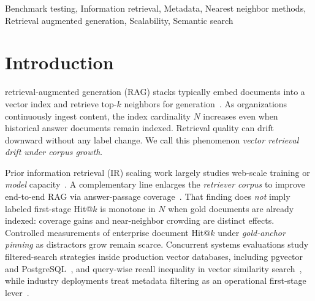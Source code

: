 \documentclass{ieeeaccess}
\makeatletter
\DeclareRobustCommand{\_}{\ifmmode\nfss@text{\textunderscore}\else\textunderscore\allowbreak\fi}
\makeatother
\begin{document}
\begin{keywords}
Benchmark testing, Information retrieval, Metadata, Nearest neighbor methods, Retrieval augmented generation, Scalability, Semantic search
\end{keywords}

\titlepgskip=-15pt
\maketitle

\section{Introduction}
\label{sec:introduction}
 retrieval-augmented generation (RAG) stacks typically embed documents into a vector index and retrieve top-$k$ neighbors for generation~\cite{lewis2020rag,karpukhin2020dpr}. As organizations continuously ingest content, the index cardinality $N$ increases even when historical answer documents remain indexed. Retrieval quality can drift downward without any label change. We call this phenomenon \emph{vector retrieval drift under corpus growth}.

Prior information retrieval (IR) scaling work largely studies web-scale training or \emph{model} capacity~\cite{ni2021large,fang2024drscale}. A complementary line enlarges the \emph{retriever corpus} to improve end-to-end RAG via answer-passage coverage~\cite{lessllm2025docs}. That finding does \emph{not} imply labeled first-stage Hit@$k$ is monotone in $N$ when gold documents are already indexed: coverage gains and near-neighbor crowding are distinct effects. Controlled measurements of enterprise document Hit@$k$ under \emph{gold-anchor pinning} as distractors grow remain scarce. Concurrent systems evaluations study filtered-search strategies inside production vector databases, including pgvector and PostgreSQL~\cite{amanbayev2026fanns,lu2026pgfvs}, and query-wise recall inequality in vector similarity search~\cite{shahri2026rcheck}, while industry deployments treat metadata filtering as an operational first-stage lever~\cite{ragfusion2026}.
\end{document}
